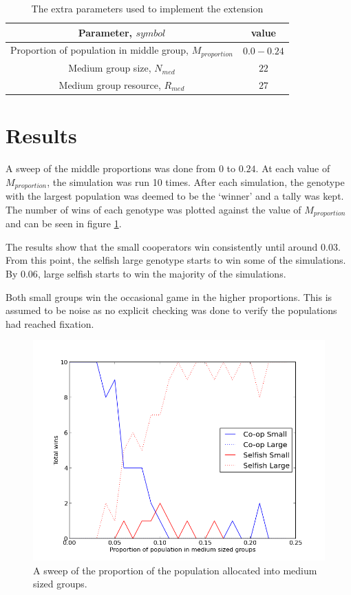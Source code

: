 \documentclass[11pt]{ecsarticle}
\begin{document}
\begin{table}
 \caption{The extra parameters used to implement the extension}
 \label{table:extparams}
 \begin{tabular}{|c|c|}
  Parameter, $symbol$ & value \\ \hline 
  Proportion of population in middle group, $M_{proportion}$ & $0.0 - 0.24$ \\ 
  Medium group size, $N_{med}$ & $22$ \\
  Medium group resource, $R_{med}$ & $27$ \\ \hline
 \end{tabular}
\end{table}


\section{Results}\label{sc:results}

A sweep of the middle proportions was done from $0$ to $0.24$. 
At each value of $M_{proportion}$, the simulation was run 10 times.
After each simulation, the genotype with the largest population was deemed to be the `winner' and a tally was kept. 
The number of wins of each genotype was plotted against the value of $M_{proportion}$ and can be seen in figure \ref{fig:extresult}.

The results show that the small cooperators win consistently until around $0.03$. 
From this point, the selfish large genotype starts to win some of the simulations. 
By $0.06$, large selfish starts to win the majority of the simulations.

Both small groups win the occasional game in the higher proportions. 
This is assumed to be noise as no explicit checking was done to verify the populations had reached fixation. 

\begin{figure}
 \centering
 \includegraphics{Code2/extresults.png}
 \caption{A sweep of the proportion of the population allocated into medium sized groups.}
 \label{fig:extresult}
\end{figure}
\end{document}
